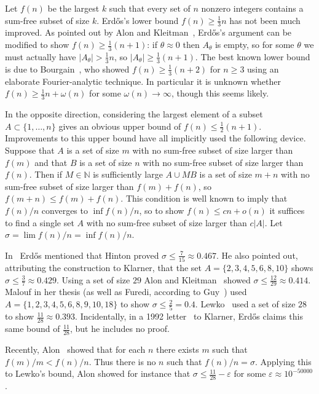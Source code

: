 \documentclass[10pt,reqno]{amsart}
\theoremstyle{definition}
\theoremstyle{remark}
\renewcommand{\leq}{\leqslant}
\renewcommand{\geq}{\geqslant}
\def\N{\mathbb{N}}
\def\eps{\varepsilon}
\numberwithin{equation}{section}
\begin{document}
Let $f(n)$ be the largest $k$ such that every set of $n$ nonzero integers contains a sum-free subset of size $k$. Erd\H{o}s's lower bound $f(n)\geq \frac{1}{3}n$ has not been much improved. As pointed out by Alon and Kleitman~\cite{alonkleitman}, Erd\H{o}s's argument can be modified to show $f(n)\geq \frac{1}{3}(n+1)$: if $\theta\approx 0$ then $A_\theta$ is empty, so for some $\theta$ we must actually have $|A_\theta|>\frac{1}{3}n$, so $|A_\theta|\geq\frac{1}{3}(n+1)$. The best known lower bound is due to Bourgain~\cite{bourgain}, who showed $f(n)\geq\frac{1}{3}(n+2)$ for $n\geq 3$ using an elaborate Fourier-analytic technique. In particular it is unknown whether $f(n)\geq \frac{1}{3}n + \omega(n)$ for some $\omega(n)\to\infty$, though this seems likely.

In the opposite direction, considering the largest element of a subset $A \subset \{1,\ldots,n\}$ gives an obvious upper bound of $f(n)\leq \frac{1}{2}(n+1)$. Improvements to this upper bound have all implicitly used the following device. Suppose that $A$ is a set of size $m$ with no sum-free subset of size larger than $f(m)$ and that $B$ is a set of size $n$ with no sum-free subset of size larger than $f(n)$. Then if $M\in\N$ is sufficiently large $A\cup M B$ is a set of size $m+n$ with no sum-free subset of size larger than $f(m) + f(n)$, so $f(m+n)\leq f(m)+f(n)$. This condition is well known to imply that $f(n)/n$ converges to $\inf f(n)/n$, so to show $f(n)\leq cn + o(n)$ it suffices to find a single set $A$ with no sum-free subset of size larger than $c|A|$. Let $\sigma = \lim f(n)/n = \inf f(n)/n$.

In~\cite{erdos1} Erd\H{o}s mentioned that Hinton proved $\sigma\leq\tfrac{7}{15}\approx0.467$. He also pointed out, attributing the construction to Klarner, that the set $A=\{2,3,4,5,6,8,10\}$ shows $\sigma\leq\tfrac{3}{7}\approx 0.429$. Using a set of size $29$ Alon and Kleitman~\cite{alonkleitman} showed $\sigma\leq\frac{12}{29} \approx 0.414$. Malouf \cite{malouf} in her thesis (as well as Furedi, according to Guy~\cite{guy}) used $A = \{1,2,3,4,5,6,8,9,10,18\}$ to show $\sigma\leq\tfrac{2}{5} = 0.4$. Lewko~\cite{lewko} used a set of size $28$ to show $\frac{11}{28} \approx 0.393$. Incidentally, in a 1992 letter~\cite{erdosklarner} to Klarner, Erd\H{o}s claims this same bound of $\tfrac{11}{28}$, but he includes no proof.

Recently, Alon~\cite{alon} showed that for each $n$ there exists $m$ such that $f(m)/m < f(n)/n$. Thus there is no $n$ such that $f(n)/n = \sigma$. Applying this to Lewko's bound, Alon showed for instance that $\sigma \leq \frac{11}{28} - \eps$ for some $\eps \approx 10^{-50000}$.
\end{document}
